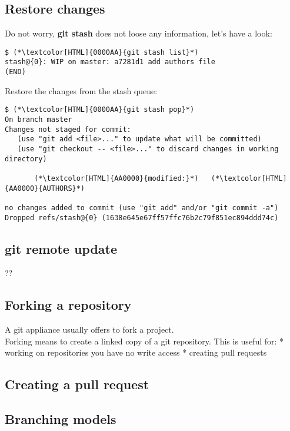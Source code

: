\subsection{Restore changes}
\begin{frame}[fragile]
  \subslidetitle

  Do not worry, \textbf{git stash} does not loose any information, let's have a look:

  \begin{lstlisting}
$ (*\textcolor[HTML]{0000AA}{git stash list}*)
stash@{0}: WIP on master: a7281d1 add authors file
(END)
\end{lstlisting}

  Restore the changes from the stash queue:

  \begin{lstlisting}
$ (*\textcolor[HTML]{0000AA}{git stash pop}*)
On branch master
Changes not staged for commit:
   (use "git add <file>..." to update what will be committed)
   (use "git checkout -- <file>..." to discard changes in working directory)

       (*\textcolor[HTML]{AA0000}{modified:}*)   (*\textcolor[HTML]{AA0000}{AUTHORS}*)

no changes added to commit (use "git add" and/or "git commit -a")
Dropped refs/stash@{0} (1638e645e67ff57ffc76b2c79f851ec894ddd74c)
\end{lstlisting}
\end{frame}

\subsection{git remote update}
\begin{frame}[fragile]
  \subslidetitle
  ??
\end{frame}

\subsection{Forking a repository}
\begin{frame}[fragile]
  \subslidetitle
  A git appliance usually offers to fork a project.\\
  Forking means to create a linked copy of a git repository.
  \vspace{1em}
  This is useful for:
  * working on repositories you have no write access
  * creating pull requests
\end{frame}

\subsection{Creating a pull request}
\begin{frame}[fragile]
  \subslidetitle
\end{frame}

\subsection{Branching models}
\begin{frame}[fragile]
  \subslidetitle
\end{frame}
